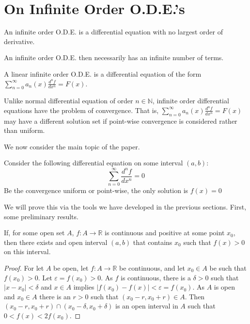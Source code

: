 \documentclass[crop=false,class=book,oneside]{standalone}
\begin{document}
        \section{On Infinite Order O.D.E.'s}
            \begin{definition}
            An infinite order O.D.E. is a differential equation with no largest order of derivative.
            \end{definition}
            \begin{remark}
            An infinite order O.D.E. then necessarily has an infinite number of terms.
            \end{remark}
            \begin{definition}
            A linear infinite order O.D.E. is a differential equation of the form $\sum_{n=0}^{\infty} a_n(x) \frac{d^n f}{dx^n} = F(x)$.
            \end{definition}
            \begin{remark}
            Unlike normal differential equation of order $n\in \mathbb{N}$, infinite order differential equations have the problem of convergence. That is, $\sum_{n=0}^{\infty} a_n(x) \frac{d^n f}{dx^n} = F(x)$ may have a different solution set if point-wise convergence is considered rather than uniform.
            \end{remark}
            We now consider the main topic of the paper.
            \begin{proposition}
            Consider the following differential equation on some interval $(a,b)$:
            \begin{equation}
            \nonumber \sum_{n=0}^{\infty} \frac{d^n f}{dx^n} = 0
            \end{equation}
            Be the convergence uniform or point-wise, the only solution is $f(x)=0$
            \end{proposition}
            We will prove this via the tools we have developed in the previous sections. First, some preliminary results.
            \begin{theorem}
            If, for some open set $A$, $f:A\rightarrow \mathbb{R}$ is continuous and positive at some point $x_0$, then there exists and open interval $(a,b)$ that contains $x_0$ such that $f(x)>0$ on this interval.
            \end{theorem}
            \begin{proof}
            For let $A$ be open, let $f:A\rightarrow \mathbb{R}$ be continuous, and let $x_0\in A$ be such that $f(x_0)>0$. Let $\varepsilon = f(x_0)>0$. As $f$ is continuous, there is a $\delta>0$ such that $|x-x_0|<\delta$ and $x\in A$ implies $|f(x_0)-f(x)|<\varepsilon = f(x_0)$. As $A$ is open and $x_0\in A$ there is an $r>0$ such that $(x_0-r,x_0+r)\in A$. Then $(x_0-r,x_0+r)\cap (x_0-\delta,x_0+\delta)$ is an open interval in $A$ such that $0<f(x)<2f(x_0)$.
            \end{proof}
\end{document}
